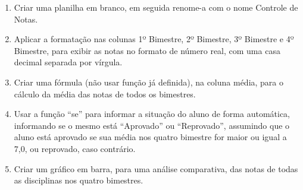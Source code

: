 \documentclass[11pt]{article}
\begin{document}
	\begin{enumerate}
		\item Criar uma planilha em branco, em seguida renome-a com o nome Controle de Notas.
		\item Aplicar a formatação nas colunas 1º Bimestre, 2º Bimestre, 3º Bimestre e 4º Bimestre, para exibir as notas no formato de número real, com uma casa decimal separada por vírgula.
		\item Criar uma fórmula (não usar função já definida), na coluna média, para o cálculo da média das notas de todos os bimestres.
		\item Usar a função “se” para informar a situação do aluno de forma automática, informando se o mesmo está “Aprovado” ou “Reprovado”, assumindo que o aluno está aprovado se sua média nos quatro bimestre for maior ou igual a 7,0, ou reprovado, caso contrário.
		\item Criar um gráfico em barra, para uma análise comparativa, das notas de todas as disciplinas nos quatro bimestres.
	\end{enumerate}
\end{document}
